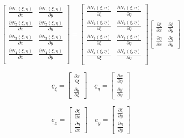 \documentclass[a4paper]{jpconf}
\begin{document}
\begin{equation}
\begin{bmatrix}
\frac{\partial N_{1}\left(\xi,\eta\right)}{\partial x}&\frac{\partial N_{1}\left(\xi,\eta\right)}{\partial y}\\
\frac{\partial N_{2}\left(\xi,\eta\right)}{\partial x}&\frac{\partial N_{2}\left(\xi,\eta\right)}{\partial y}\\
\frac{\partial N_{3}\left(\xi,\eta\right)}{\partial x}&\frac{\partial N_{3}\left(\xi,\eta\right)}{\partial y}\\
\frac{\partial N_{4}\left(\xi,\eta\right)}{\partial x}&\frac{\partial N_{4}\left(\xi,\eta\right)}{\partial y}\\
\end{bmatrix}=\begin{bmatrix}
\frac{\partial N_{1}\left(\xi,\eta\right)}{\partial \xi}&\frac{\partial N_{1}\left(\xi,\eta\right)}{\partial \eta}\\
\frac{\partial N_{2}\left(\xi,\eta\right)}{\partial \xi}&\frac{\partial N_{2}\left(\xi,\eta\right)}{\partial \eta}\\
\frac{\partial N_{3}\left(\xi,\eta\right)}{\partial \xi}&\frac{\partial N_{3}\left(\xi,\eta\right)}{\partial \eta}\\
\frac{\partial N_{4}\left(\xi,\eta\right)}{\partial \xi}&\frac{\partial N_{4}\left(\xi,\eta\right)}{\partial \eta}\\
\end{bmatrix}\begin{bmatrix}
\frac{\partial \xi}{\partial x}&\frac{\partial \xi}{\partial y}\\\frac{\partial \eta}{\partial x}&\frac{\partial \eta}{\partial y}
\end{bmatrix}
\end{equation}

\begin{equation}
\underline{e}_{\xi}=\begin{bmatrix}
\frac{\partial x}{\partial\xi}\\\frac{\partial y}{\partial\xi}
\end{bmatrix}\quad\underline{e}_{\eta}=\begin{bmatrix}
\frac{\partial x}{\partial\eta}\\\frac{\partial y}{\partial\eta}
\end{bmatrix}
\end{equation}

\begin{equation}
\underline{e}_{x}=\begin{bmatrix}
\frac{\partial \xi}{\partial x}\\\frac{\partial \eta}{\partial x}
\end{bmatrix}\quad\underline{e}_{y}=\begin{bmatrix}
\frac{\partial \xi}{\partial y}\\\frac{\partial \eta}{\partial y}
\end{bmatrix}
\end{equation}
\end{document}

